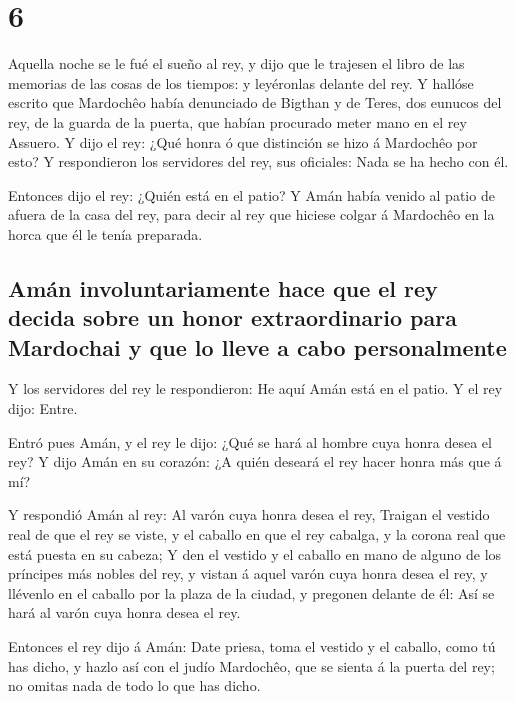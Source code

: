 \hypertarget{section-5}{%
\section{6}\label{section-5}}

 Aquella noche se le fué el sueño al rey, y dijo que le
trajesen el libro de las memorias de las cosas de los tiempos: y
leyéronlas delante del rey.  Y hallóse escrito que
Mardochêo había denunciado de Bigthan y de Teres, dos eunucos del rey,
de la guarda de la puerta, que habían procurado meter mano en el rey
Assuero.  Y dijo el rey: ¿Qué honra ó que distinción se
hizo á Mardochêo por esto? Y respondieron los servidores del rey, sus
oficiales: Nada se ha hecho con él.

 Entonces dijo el rey: ¿Quién está en el patio? Y Amán
había venido al patio de afuera de la casa del rey, para decir al rey
que hiciese colgar á Mardochêo en la horca que él le tenía preparada.

\hypertarget{amuxe1n-involuntariamente-hace-que-el-rey-decida-sobre-un-honor-extraordinario-para-mardochai-y-que-lo-lleve-a-cabo-personalmente}{%
\subsection{Amán involuntariamente hace que el rey decida sobre un honor
extraordinario para Mardochai y que lo lleve a cabo
personalmente}\label{amuxe1n-involuntariamente-hace-que-el-rey-decida-sobre-un-honor-extraordinario-para-mardochai-y-que-lo-lleve-a-cabo-personalmente}}

 Y los servidores del rey le respondieron: He aquí Amán
está en el patio. Y el rey dijo: Entre.

 Entró pues Amán, y el rey le dijo: ¿Qué se hará al hombre
cuya honra desea el rey? Y dijo Amán en su corazón: ¿A quién deseará el
rey hacer honra más que á mí?

 Y respondió Amán al rey: Al varón cuya honra desea el
rey,  Traigan el vestido real de que el rey se viste, y el
caballo en que el rey cabalga, y la corona real que está puesta en su
cabeza;  Y den el vestido y el caballo en mano de alguno
de los príncipes más nobles del rey, y vistan á aquel varón cuya honra
desea el rey, y llévenlo en el caballo por la plaza de la ciudad, y
pregonen delante de él: Así se hará al varón cuya honra desea el rey.

 Entonces el rey dijo á Amán: Date priesa, toma el
vestido y el caballo, como tú has dicho, y hazlo así con el judío
Mardochêo, que se sienta á la puerta del rey; no omitas nada de todo lo
que has dicho.

